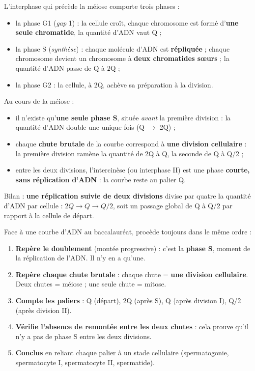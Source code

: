 \documentclass[11pt]{article}
\newcommand{\cle}[1]{{\popxbold\color{popdark}#1}}
\begin{document}
\begin{definition}
L'\cle{interphase} qui précède la méiose comporte trois phases :
\begin{itemize}
\item la phase \cle{G1} (\emph{gap} 1) : la cellule croît, chaque chromosome est formé d'\textbf{une seule chromatide}, la quantité d'ADN vaut Q ;
\item la phase \cle{S} (\emph{synthèse}) : chaque molécule d'ADN est \textbf{répliquée} ; chaque chromosome devient un chromosome à \textbf{deux chromatides sœurs} ; la quantité d'ADN passe de Q à 2Q ;
\item la phase \cle{G2} : la cellule, à 2Q, achève sa préparation à la division.
\end{itemize}
\end{definition}

\begin{propriete}
Au cours de la méiose :
\begin{itemize}
\item il n'existe qu'\textbf{une seule phase S}, située \emph{avant} la première division : la quantité d'ADN double une unique fois (Q $\rightarrow$ 2Q) ;
\item chaque \textbf{chute brutale} de la courbe correspond à \textbf{une division cellulaire} : la première division ramène la quantité de 2Q à Q, la seconde de Q à Q/2 ;
\item entre les deux divisions, l'\cle{intercinèse} (ou interphase II) est une phase \textbf{courte, sans réplication d'ADN} : la courbe reste au palier Q.
\end{itemize}
Bilan : \textbf{une réplication suivie de deux divisions} divise par quatre la quantité d'ADN par cellule : $2Q \rightarrow Q \rightarrow Q/2$, soit un passage global de Q à Q/2 par rapport à la cellule de départ.
\end{propriete}

\begin{methode}
Face à une courbe d'ADN au baccalauréat, procède toujours dans le même ordre :
\begin{enumerate}
\item \textbf{Repère le doublement} (montée progressive) : c'est la \textbf{phase S}, moment de la réplication de l'ADN. Il n'y en a qu'une.
\item \textbf{Repère chaque chute brutale} : chaque chute = \textbf{une division cellulaire}. Deux chutes = méiose ; une seule chute = mitose.
\item \textbf{Compte les paliers} : Q (départ), 2Q (après S), Q (après division I), Q/2 (après division II).
\item \textbf{Vérifie l'absence de remontée entre les deux chutes} : cela prouve qu'il n'y a pas de phase S entre les deux divisions.
\item \textbf{Conclus} en reliant chaque palier à un stade cellulaire (spermatogonie, spermatocyte I, spermatocyte II, spermatide).
\end{enumerate}
\end{methode}
\end{document}
